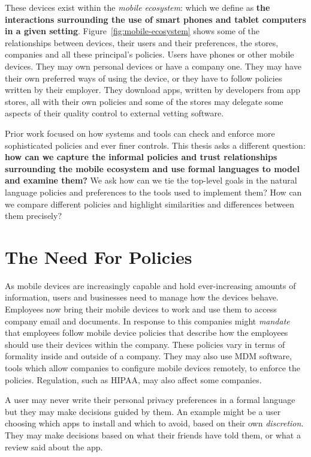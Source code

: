 \documentclass[thesis.tex]{subfiles}
\begin{document}
These devices exist within the \emph{mobile ecosystem}: which we define as
\textbf{the interactions surrounding the use of smart phones and tablet
computers in a given setting}. Figure~\ref{fig:mobile-ecosystem} shows some of the relationships
between devices, their users and their preferences, the stores, companies and
all these principal's policies. Users have phones or other mobile devices. They
may own personal devices or have a company one. They may have their own
preferred ways of using the device, or they have to follow policies written
by their employer. They download apps, written by developers from app stores,
all with their own policies and some of the stores may delegate some aspects of
their quality control to external vetting software.

Prior work focused on how systems and tools can check and enforce more
sophisticated policies and ever finer controls. This thesis asks a different
question: \textbf{how can we capture the informal policies and trust
relationships surrounding the mobile ecosystem and use formal languages to model
and examine them?} We ask how can we tie the top-level goals in the natural
language policies and preferences to the tools used to implement them? How can
we compare different policies and highlight similarities and differences between
them precisely?

\section{The Need For Policies}

As mobile devices are increasingly capable and hold ever-increasing amounts of
information, users and businesses need to manage how the devices behave.
Employees now bring their mobile devices to work and use them to access company
email and documents. In response to this companies might \emph{mandate} that
employees follow mobile device policies that describe how the employees should
use their devices within the company. These policies vary in terms of formality
inside and outside of a company. 
They may also use \ac{MDM} software, tools which allow companies to configure
mobile devices remotely, to enforce the policies. Regulation, such as
\ac{HIPAA}, may also affect some companies.

A user may never write their personal privacy preferences in a formal language
but they may make decisions guided by them. An example might be a user choosing
which apps to install and which to avoid, based on their own \emph{discretion}.
They may make decisions based on what their friends have told them, or what a
review said about the app.
\end{document}
